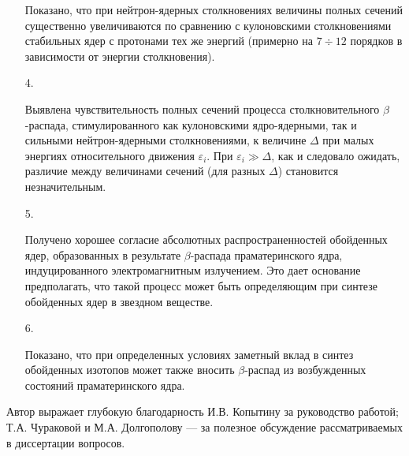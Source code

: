 \begin{itemize}
Показано, что при нейтрон-ядерных столкновениях величины полных сечений
существенно увеличиваются по сравнению с кулоновскими столкновениями
стабильных ядер с протонами тех же энергий (примерно на $7 \div 12$ порядков
в зависимости от энергии столкновения).

\item[4.]

Выявлена чувствительность полных сечений процесса столкновительного
$\beta$-распада, стимулированного как кулоновскими ядро-ядерными,
так и сильными нейтрон-ядерными столкновениями, к величине $\Delta$
при малых энергиях относительного движения $\varepsilon_i$.
При $\varepsilon_i \gg \Delta$, как и следовало ожидать, различие между
величинами сечений (для разных $\Delta$) становится незначительным.


\item[5.]

Получено хорошее согласие абсолютных распространенностей обойденных ядер,
образованных в результате  $\beta$-распада праматеринского  ядра,
индуцированного электромагнитным излучением. Это дает основание предполагать,
что такой процесс может быть определяющим при синтезе обойденных ядер в
звездном веществе.

\item[6.]

Показано, что при определенных условиях  заметный вклад в синтез
обойденных изотопов может также вносить $\beta$-распад из возбужденных
состояний праматеринского ядра.

\end{itemize}

Автор выражает глубокую благодарность И.В. Копытину за руководство работой;
Т.А. Чураковой и М.А. Долгополову --- за полезное обсуждение рассматриваемых
в диссертации вопросов.

